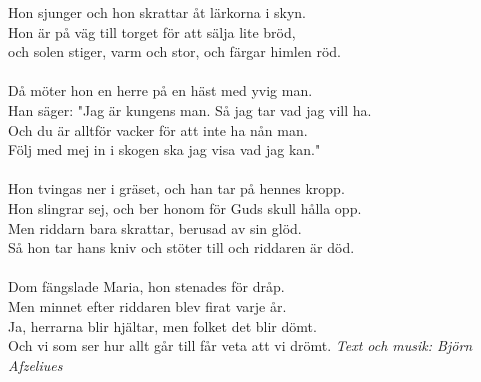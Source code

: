 \vspace{10pt}
Hon sjunger och hon skrattar åt lärkorna i skyn.\\
Hon är på väg till torget för att sälja lite bröd,\\ 
och solen stiger, varm och stor, och färgar himlen röd.\\
\\
Då möter hon en herre på en häst med yvig man.\\
Han säger: "Jag är kungens man. Så jag tar vad jag vill ha.\\ 
Och du är alltför vacker för att inte ha nån man.\\
Följ med mej in i skogen ska jag visa vad jag kan."\\
\\
Hon tvingas ner i gräset, och han tar på hennes kropp.\\
Hon slingrar sej, och ber honom för Guds skull hålla opp.\\
Men riddarn bara skrattar, berusad av sin glöd.\\
Så hon tar hans kniv och stöter till och riddaren är död.\\
\\
Dom fängslade Maria, hon stenades för dråp.\\
Men minnet efter riddaren blev firat varje år.\\
Ja, herrarna blir hjältar, men folket det blir dömt.\\
Och vi som ser hur allt går till får veta att vi drömt.
\vspace{10pt}
{\footnotesize\textit{Text och musik: Björn Afzeliues}}



 
